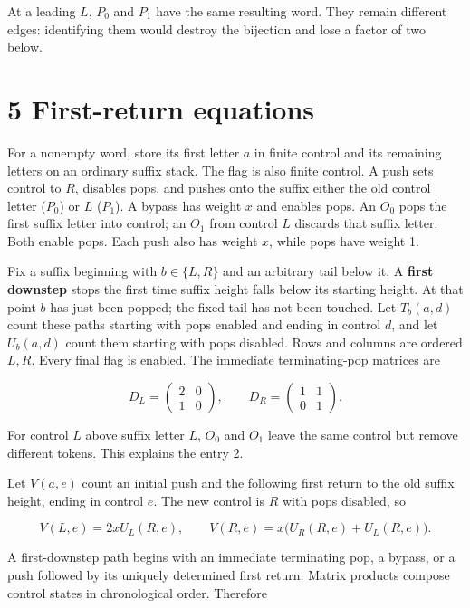 \documentclass[11pt,letterpaper]{article}
\begin{document}
At a leading \(L\), \(P_0\) and \(P_1\) have the same resulting word.
They remain different edges: identifying them would destroy the
bijection and lose a factor of two below.

\section{5 First-return equations}\label{first-return-equations}

For a nonempty word, store its first letter \(a\) in finite control and
its remaining letters on an ordinary suffix stack. The flag is also
finite control. A push sets control to \(R\), disables pops, and pushes
onto the suffix either the old control letter (\(P_0\)) or \(L\)
(\(P_1\)). A bypass has weight \(x\) and enables pops. An \(O_0\) pops
the first suffix letter into control; an \(O_1\) from control \(L\)
discards that suffix letter. Both enable pops. Each push also has weight
\(x\), while pops have weight 1.

Fix a suffix beginning with \(b\in\{L,R\}\) and an arbitrary tail below
it. A \textbf{first downstep} stops the first time suffix height falls
below its starting height. At that point \(b\) has just been popped; the
fixed tail has not been touched. Let \(T_b(a,d)\) count these paths
starting with pops enabled and ending in control \(d\), and let
\(U_b(a,d)\) count them starting with pops disabled. Rows and columns
are ordered \(L,R\). Every final flag is enabled. The immediate
terminating-pop matrices are

\[D_L=\begin{pmatrix}2&0\\1&0\end{pmatrix},\qquad
D_R=\begin{pmatrix}1&1\\0&1\end{pmatrix}.\]

For control \(L\) above suffix letter \(L\), \(O_0\) and \(O_1\) leave
the same control but remove different tokens. This explains the entry 2.

Let \(V(a,e)\) count an initial push and the following first return to
the old suffix height, ending in control \(e\). The new control is \(R\)
with pops disabled, so

\[V(L,e)=2xU_L(R,e),\qquad
V(R,e)=x\bigl(U_R(R,e)+U_L(R,e)\bigr).\]

A first-downstep path begins with an immediate terminating pop, a
bypass, or a push followed by its uniquely determined first return.
Matrix products compose control states in chronological order. Therefore
\end{document}
